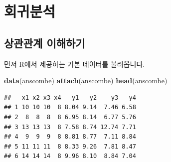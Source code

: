 \documentclass[12pt,]{book}
\newenvironment{Shaded}{\begin{snugshade}}{\end{snugshade}}
\newcommand{\ControlFlowTok}[1]{\textcolor[rgb]{0.13,0.29,0.53}{\textbf{#1}}}
\newcommand{\DataTypeTok}[1]{\textcolor[rgb]{0.13,0.29,0.53}{#1}}
\newcommand{\KeywordTok}[1]{\textcolor[rgb]{0.13,0.29,0.53}{\textbf{#1}}}
\newcommand{\NormalTok}[1]{#1}
\newcommand{\OperatorTok}[1]{\textcolor[rgb]{0.81,0.36,0.00}{\textbf{#1}}}
\newcommand{\OtherTok}[1]{\textcolor[rgb]{0.56,0.35,0.01}{#1}}
\newcommand{\StringTok}[1]{\textcolor[rgb]{0.31,0.60,0.02}{#1}}
\begin{document}
\begin{Shaded}
\end{Shaded}

\hypertarget{uxd68cuxadc0uxbd84uxc11d}{%
\chapter{회귀분석}\label{uxd68cuxadc0uxbd84uxc11d}}

\hypertarget{uxc0c1uxad00uxad00uxacc4-uxc774uxd574uxd558uxae30}{%
\section{상관관계 이해하기}\label{uxc0c1uxad00uxad00uxacc4-uxc774uxd574uxd558uxae30}}

먼저 R에서 제공하는 기본 데이터를 불러옵니다.

\begin{Shaded}
\begin{Highlighting}[]
\KeywordTok{data}\NormalTok{(anscombe)}
\KeywordTok{attach}\NormalTok{(anscombe)}
\KeywordTok{head}\NormalTok{(anscombe)}
\end{Highlighting}
\end{Shaded}

\begin{verbatim}
##   x1 x2 x3 x4   y1   y2    y3   y4
## 1 10 10 10  8 8.04 9.14  7.46 6.58
## 2  8  8  8  8 6.95 8.14  6.77 5.76
## 3 13 13 13  8 7.58 8.74 12.74 7.71
## 4  9  9  9  8 8.81 8.77  7.11 8.84
## 5 11 11 11  8 8.33 9.26  7.81 8.47
## 6 14 14 14  8 9.96 8.10  8.84 7.04
\end{verbatim}
\end{document}

